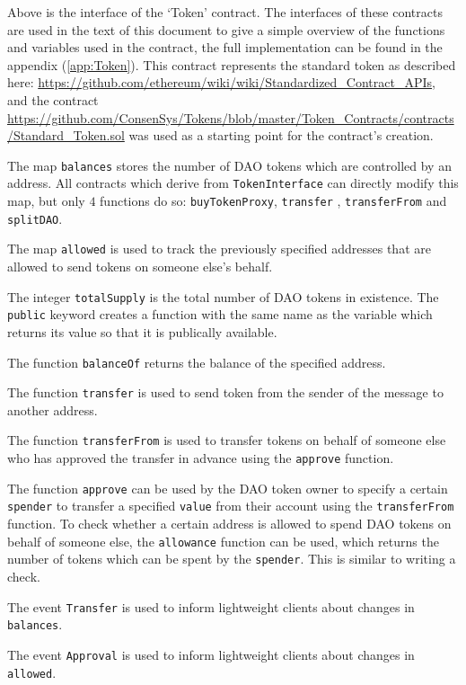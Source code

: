 \documentclass[9pt,oneside]{amsart}
\begin{document}
\begin{multicols}{2}

Above is the interface of the ‘Token’ contract. The interfaces of these contracts are used in the text of this document to give a simple overview of the functions and variables used in the contract, the full implementation can be found in the appendix (\ref{app:Token}). This contract represents the standard token as described here:
\url{https://github.com/ethereum/wiki/wiki/Standardized_Contract_APIs}, and the contract \url{https://github.com/ConsenSys/Tokens/blob/master/Token_Contracts/contracts/Standard_Token.sol} was used as a starting point for the contract’s creation.

The map \verb|balances| stores the number of DAO tokens which are controlled by an address. All contracts which derive from \verb|TokenInterface| can directly modify this map, but only $4$ functions do so: \verb|buyTokenProxy|, \verb|transfer| , \verb|transferFrom| and \verb|splitDAO|.

The map \verb|allowed| is used to track the previously specified addresses that are allowed to send tokens on someone else's behalf.

The integer \verb|totalSupply| is the total number of DAO tokens in existence. The \verb|public| keyword creates a function with the same name as the variable which returns its value so that it is publically available.

The function \verb|balanceOf| returns the balance of the specified address. 

The function \verb|transfer| is used to send token from the sender of the message to another address.

The function \verb|transferFrom| is used to transfer tokens on behalf of someone else who has approved the transfer in advance using the \verb|approve| function.

The function \verb|approve| can be used by the DAO token owner to specify a certain \verb|spender| to transfer a specified \verb|value| from their account using the \verb|transferFrom| function. To check whether a certain address is allowed to spend DAO tokens on behalf of someone else, the \verb|allowance| function can be used, which returns the number of tokens which can be spent by the \verb|spender|. This is similar to writing a check.

The event \verb|Transfer| is used to inform lightweight clients about changes in \verb|balances|.

The event \verb|Approval| is used to inform lightweight clients about changes in \verb|allowed|.
\end{multicols}
\end{document}
